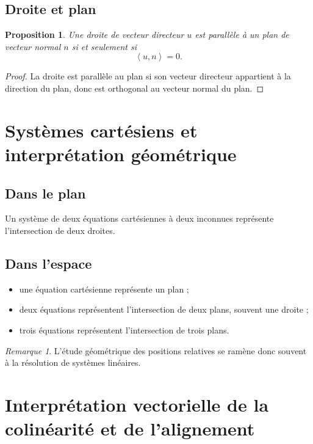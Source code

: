 \documentclass[11pt,a4paper]{article}
\newtheorem{proposition}[definition]{Proposition}
\theoremstyle{remark}
\newtheorem{remarque}[definition]{Remarque}
\newcommand{\scal}[2]{\left\langle #1,#2\right\rangle}
\begin{document}
\subsection{Droite et plan}

\begin{proposition}
Une droite de vecteur directeur \(u\) est parallèle à un plan de vecteur normal \(n\) si et seulement si
\[
\scal{u}{n}=0.
\]
\end{proposition}

\begin{proof}
La droite est parallèle au plan si son vecteur directeur appartient à la direction du plan, donc est orthogonal au vecteur normal du plan.
\end{proof}

\section{Systèmes cartésiens et interprétation géométrique}

\subsection{Dans le plan}

Un système de deux équations cartésiennes à deux inconnues représente l’intersection de deux droites.

\subsection{Dans l’espace}

\begin{itemize}
    \item une équation cartésienne représente un plan ;
    \item deux équations représentent l’intersection de deux plans, souvent une droite ;
    \item trois équations représentent l’intersection de trois plans.
\end{itemize}

\begin{remarque}
L’étude géométrique des positions relatives se ramène donc souvent à la résolution de systèmes linéaires.
\end{remarque}

\section{Interprétation vectorielle de la colinéarité et de l’alignement}
\end{document}
